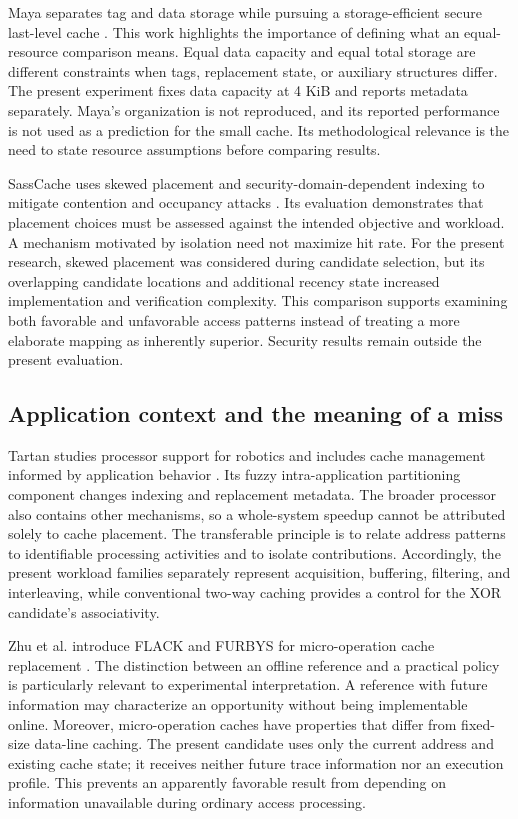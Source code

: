 \documentclass[11pt,a4paper]{article}
\begin{document}
Maya separates tag and data storage while pursuing a storage-efficient secure last-level cache \cite{bhatla2024}. This work highlights the importance of defining what an equal-resource comparison means. Equal data capacity and equal total storage are different constraints when tags, replacement state, or auxiliary structures differ. The present experiment fixes data capacity at 4 KiB and reports metadata separately. Maya's organization is not reproduced, and its reported performance is not used as a prediction for the small cache. Its methodological relevance is the need to state resource assumptions before comparing results.

SassCache uses skewed placement and security-domain-dependent indexing to mitigate contention and occupancy attacks \cite{giner2023}. Its evaluation demonstrates that placement choices must be assessed against the intended objective and workload. A mechanism motivated by isolation need not maximize hit rate. For the present research, skewed placement was considered during candidate selection, but its overlapping candidate locations and additional recency state increased implementation and verification complexity. This comparison supports examining both favorable and unfavorable access patterns instead of treating a more elaborate mapping as inherently superior. Security results remain outside the present evaluation.

\subsection{Application context and the meaning of a miss}
Tartan studies processor support for robotics and includes cache management informed by application behavior \cite{bakhshalipour2024}. Its fuzzy intra-application partitioning component changes indexing and replacement metadata. The broader processor also contains other mechanisms, so a whole-system speedup cannot be attributed solely to cache placement. The transferable principle is to relate address patterns to identifiable processing activities and to isolate contributions. Accordingly, the present workload families separately represent acquisition, buffering, filtering, and interleaving, while conventional two-way caching provides a control for the XOR candidate's associativity.

Zhu et al. introduce FLACK and FURBYS for micro-operation cache replacement \cite{zhu2025}. The distinction between an offline reference and a practical policy is particularly relevant to experimental interpretation. A reference with future information may characterize an opportunity without being implementable online. Moreover, micro-operation caches have properties that differ from fixed-size data-line caching. The present candidate uses only the current address and existing cache state; it receives neither future trace information nor an execution profile. This prevents an apparently favorable result from depending on information unavailable during ordinary access processing.
\end{document}
